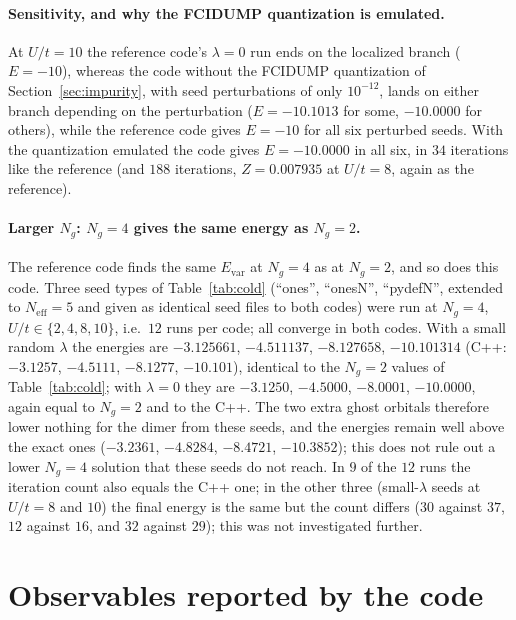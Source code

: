 \documentclass[11pt]{article}
\newcommand{\Neff}{N_{\mathrm{eff}}}
\newcommand{\Ng}{N_{g}}
\begin{document}
\paragraph{Sensitivity, and why the FCIDUMP quantization is emulated.} At
$U/t=10$ the reference code's $\lambda=0$ run ends on the localized branch
($E=-10$), whereas the code without the FCIDUMP quantization
of Section~\ref{sec:impurity}, with seed perturbations of only $10^{-12}$, lands
on either branch depending on the perturbation ($E=-10.1013$ for some, $-10.0000$
for others), while the reference code gives $E=-10$ for all six perturbed
seeds. With the quantization emulated the code gives $E=-10.0000$ in all six, in
$34$ iterations like the reference (and $188$ iterations, $Z=0.007935$ at
$U/t=8$, again as the reference).

\paragraph{Larger $\Ng$: $\Ng=4$ gives the same energy as $\Ng=2$.} The
reference code finds the same $E_{\mathrm{var}}$ at $\Ng=4$ as at $\Ng=2$, and so
does this code. Three seed types of Table~\ref{tab:cold} (``ones'', ``onesN'',
``pydefN'', extended to $\Neff=5$ and given as identical seed files to both
codes) were run at $\Ng=4$, $U/t\in\{2,4,8,10\}$, i.e.\ $12$ runs per code; all
converge in both codes. With a small random $\lambda$ the energies are $-3.125661$,
$-4.511137$, $-8.127658$, $-10.101314$ (C++: $-3.1257$, $-4.5111$, $-8.1277$,
$-10.101$), identical to the $\Ng=2$ values of Table~\ref{tab:cold}; with
$\lambda=0$ they are $-3.1250$, $-4.5000$, $-8.0001$, $-10.0000$, again equal to
$\Ng=2$ and to the C++. The two extra ghost orbitals therefore lower
nothing for the dimer from these seeds, and the energies remain well above the
exact ones ($-3.2361$, $-4.8284$, $-8.4721$, $-10.3852$); this does not rule out
a lower $\Ng=4$ solution that these seeds do not reach. In $9$ of the $12$ runs
the iteration count also equals the C++ one; in the other three (small-$\lambda$
seeds at $U/t=8$ and $10$) the final energy is the same but the count differs
($30$ against $37$, $12$ against $16$, and $32$ against $29$); this was not
investigated further.

\section{Observables reported by the code}
\end{document}
